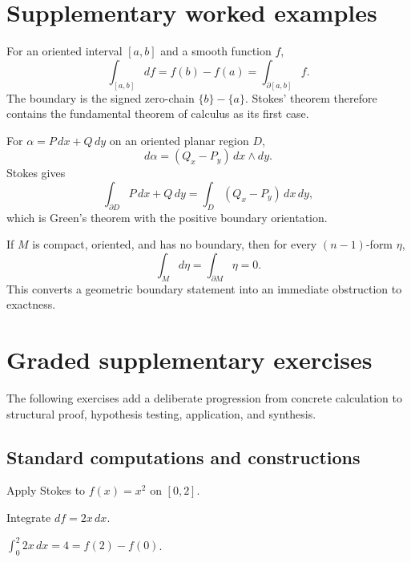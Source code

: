 \section{Supplementary worked examples}
\label{sec:vii11-pedagogy}

\begin{example}\label{ex:vii11-ped-01}
For an oriented interval \([a,b]\) and a smooth function \(f\),
\[
\int_{[a,b]}df=f(b)-f(a)=\int_{\partial[a,b]}f.
\]
The boundary is the signed zero-chain \(\{b\}-\{a\}\).  Stokes' theorem therefore contains the fundamental theorem of calculus as its first case.
\end{example}

\begin{example}\label{ex:vii11-ped-02}
For \(\alpha=P\,dx+Q\,dy\) on an oriented planar region \(D\),
\[
d\alpha=(Q_x-P_y)\,dx\wedge dy.
\]
Stokes gives
\[
\int_{\partial D}P\,dx+Q\,dy=\int_D(Q_x-P_y)\,dx\,dy,
\]
which is Green's theorem with the positive boundary orientation.
\end{example}

\begin{example}\label{ex:vii11-ped-03}
If \(M\) is compact, oriented, and has no boundary, then for every \((n-1)\)-form \(\eta\),
\[
\int_M d\eta=\int_{\partial M}\eta=0.
\]
This converts a geometric boundary statement into an immediate obstruction to exactness.
\end{example}

\section{Graded supplementary exercises}
The following exercises add a deliberate progression from concrete calculation to structural proof, hypothesis testing, application, and synthesis.

\subsection*{Standard computations and constructions}

\begin{exercise}\label{exr:vii11-ped-01}
Apply Stokes to \(f(x)=x^2\) on \([0,2]\).
\end{exercise}
\begin{hint}
Integrate \(df=2x\,dx\).
\end{hint}
\begin{solution}
\(\int_0^2 2x\,dx=4=f(2)-f(0)\).
\end{solution}

